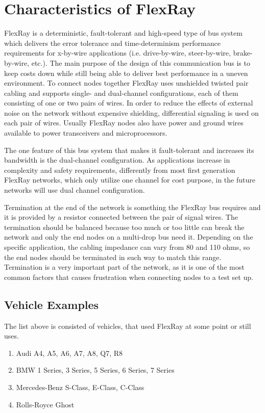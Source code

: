 \documentclass[conference]{IEEEtran}
\begin{document}
\section{Characteristics of FlexRay}
FlexRay is a deterministic, fault-tolerant and high-speed type of bus system which delivers the error tolerance and time-determinism performance requirements for x-by-wire applications (i.e. drive-by-wire, steer-by-wire, brake-by-wire, etc.). The main purpose of the design of this communication bus is to keep costs down while still being able to deliver best performance in a uneven environment. To connect nodes together FlexRay uses unshielded twisted pair cabling and supports single- and dual-channel configurations, each of them consisting of one or two pairs of wires. In order to reduce the effects of external noise on the network without expensive shielding, differential signaling is used on each pair of wires. Usually FlexRay nodes also have power and ground wires available to power transceivers and microprocessors.

The one feature of this bus system that makes it fault-tolerant and increases its bandwidth is the dual-channel configuration. As applications increase in complexity and safety requirements, differently from most first generation FlexRay networks, which only utilize one channel for cost purpose, in the future networks will use dual channel configuration.

Termination at the end of the network is something the FlexRay bus requires and it is provided by a resistor connected between the pair of signal wires. The termination should be balanced because too much or too little can break the network and only the end nodes on a multi-drop bus need it. Depending on the specific application, the cabling impedance can vary from 80 and 110 ohms, so the end nodes should be terminated in such way to match this range. Termination is a very important part of the network, as it is one of the most common factors that causes frustration when connecting nodes to a test set up.\\

\subsection{Vehicle Examples}
The list above is consisted of vehicles, that used FlexRay at some point or still uses.\\
\begin{enumerate}
  \item Audi A4, A5, A6, A7, A8, Q7, R8\\
  
  \item BMW 1 Series, 3 Series, 5 Series, 6 Series, 7 Series\\
  
  \item Mercedes-Benz S-Class, E-Class, C-Class\\
  
  \item Rolls-Royce Ghost\\
  
\end{enumerate}
\end{document}

